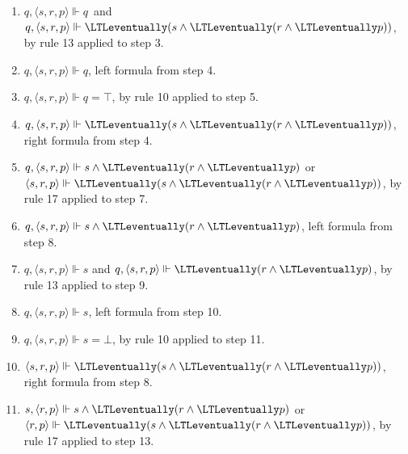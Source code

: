 \begin{myEx}
\begin{enumerate}
\item $q , \langle s,r,p \rangle \Vdash q$\ and\ $q , \langle s,r,p \rangle \Vdash \LTLeventually(s \land \LTLeventually(r \land \LTLeventually p))$, by rule 13 applied to step 3.\\ %

\item $q , \langle s,r,p \rangle \Vdash q$, left formula from step 4.\\ %

\item $q , \langle s,r,p \rangle \Vdash q = \top$, by rule 10 applied to step 5.\\ %

\item $q, \langle s,r,p \rangle \Vdash \LTLeventually(s \land \LTLeventually(r \land \LTLeventually p))$, right formula from step 4.\\ %

\item $q, \langle s,r,p \rangle \Vdash s \land \LTLeventually(r \land \LTLeventually p)$ or $\langle s,r,p \rangle \Vdash \LTLeventually(s \land \LTLeventually(r \land \LTLeventually p))$, by rule 17 applied to step 7.\\ %

\item $q, \langle s,r,p \rangle \Vdash s \land \LTLeventually(r \land \LTLeventually p)$, left formula from step 8.\\ %

\item $q, \langle s,r,p \rangle \Vdash s$ and $q, \langle s,r,p \rangle \Vdash \LTLeventually(r \land \LTLeventually p)$, by rule 13 applied to step 9.\\ %

\item $q, \langle s,r,p \rangle \Vdash s$, left formula from step 10.\\ %

\item $q, \langle s,r,p \rangle \Vdash s = \bot$, by rule 10 applied to step 11.\\ %

\item $\langle s,r,p \rangle \Vdash \LTLeventually(s \land \LTLeventually(r \land \LTLeventually p))$, right formula from step 8.\\ %

\item $s, \langle r,p \rangle \Vdash s \land \LTLeventually(r \land \LTLeventually p)$ or $\langle r,p \rangle \Vdash \LTLeventually(s \land \LTLeventually(r \land \LTLeventually p))$, by rule 17 applied to step 13.\\ %


\end{enumerate}
\end{myEx}
